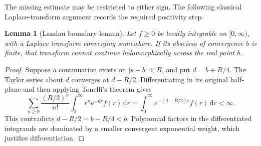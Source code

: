 \documentclass[11pt]{article}
\numberwithin{equation}{section}
\newtheorem{lemma}[theorem]{Lemma}
\theoremstyle{definition}
\theoremstyle{remark}
\newcommand{\dd}{\,\mathrm d}
\begin{document}
The missing estimate may be restricted to either sign.  The following
classical Laplace-transform argument records the required positivity step.
\begin{lemma}[Landau boundary lemma]\label{lem:probe-landau}
Let \(f\ge0\) be locally integrable on \([0,\infty)\), with a Laplace
transform converging somewhere.  If its abscissa of convergence \(b\) is
finite, that transform cannot continue holomorphically across the real point \(b\).
\end{lemma}
\begin{proof}
Suppose a continuation exists on \(|s-b|<R\), and put \(d=b+R/4\).
The Taylor series about \(d\) converges at \(d-R/2\). Differentiating in
its original half-plane and then applying Tonelli's theorem gives
\[
 \sum_{n\ge0}\frac{(R/2)^n}{n!}
       \int_0^\infty r^ne^{-dr}f(r)\dd r
 =\int_0^\infty e^{-(d-R/2)r}f(r)\dd r<\infty.
\]
This contradicts \(d-R/2=b-R/4<b\).  Polynomial factors in the
differentiated integrands are dominated by a smaller convergent
exponential weight, which justifies differentiation.
\end{proof}
\end{document}
